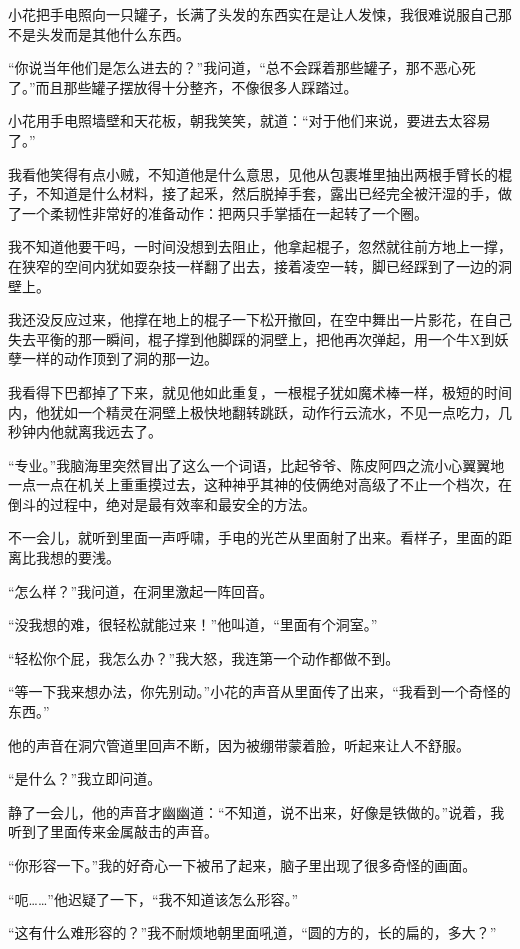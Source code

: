 小花把手电照向一只罐子，长满了头发的东西实在是让人发悚，我很难说服自己那不是头发而是其他什么东西。

“你说当年他们是怎么进去的？”我问道，“总不会踩着那些罐子，那不恶心死了。”而且那些罐子摆放得十分整齐，不像很多人踩踏过。

小花用手电照墙壁和天花板，朝我笑笑，就道：“对于他们来说，要进去太容易了。”

我看他笑得有点小贼，不知道他是什么意思，见他从包裹堆里抽出两根手臂长的棍子，不知道是什么材料，接了起釆，然后脱掉手套，露出已经完全被汗湿的手，做了一个柔韧性非常好的准备动作：把两只手掌插在一起转了一个圈。

我不知道他要干吗，一时间没想到去阻止，他拿起棍子，忽然就往前方地上一撑，在狭窄的空间内犹如耍杂技一样翻了出去，接着凌空一转，脚已经踩到了一边的洞壁上。

我还没反应过来，他撑在地上的棍子一下松开撤回，在空中舞出一片影花，在自己失去平衡的那一瞬间，棍子撑到他脚踩的洞壁上，把他再次弹起，用一个牛X到妖孽一样的动作顶到了洞的那一边。

我看得下巴都掉了下来，就见他如此重复，一根棍子犹如魔术棒一样，极短的时间内，他犹如一个精灵在洞壁上极快地翻转跳跃，动作行云流水，不见一点吃力，几秒钟内他就离我远去了。

“专业。”我脑海里突然冒出了这么一个词语，比起爷爷、陈皮阿四之流小心翼翼地一点一点在机关上重重摸过去，这种神乎其神的伎俩绝对高级了不止一个档次，在倒斗的过程中，绝对是最有效率和最安全的方法。

不一会儿，就听到里面一声呼啸，手电的光芒从里面射了出来。看样子，里面的距离比我想的要浅。

“怎么样？”我问道，在洞里激起一阵回音。

“没我想的难，很轻松就能过来！”他叫道，“里面有个洞室。”

“轻松你个屁，我怎么办？”我大怒，我连第一个动作都做不到。

“等一下我来想办法，你先别动。”小花的声音从里面传了出来，“我看到一个奇怪的东西。”

他的声音在洞穴管道里回声不断，因为被绷带蒙着脸，听起来让人不舒服。

“是什么？”我立即问道。

静了一会儿，他的声音才幽幽道：“不知道，说不出来，好像是铁做的。”说着，我听到了里面传来金属敲击的声音。

“你形容一下。”我的好奇心一下被吊了起来，脑子里出现了很多奇怪的画面。

“呃……”他迟疑了一下，“我不知道该怎么形容。”

“这有什么难形容的？”我不耐烦地朝里面吼道，“圆的方的，长的扁的，多大？”

